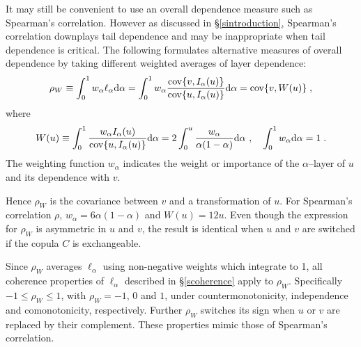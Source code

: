 \documentclass[authoryear]{elsarticle}
\newcommand{\cov}{{\rm cov}}
\newcommand{\de}{\mathrm{d}}
\newcommand{\cq}{\ ,\quad }
\newcommand{\sref}[1]{\S\ref{#1}}
\begin{document}
It may still be convenient to use an overall dependence measure such as Spearman's correlation. However as discussed in \sref{sintroduction}, Spearman's correlation downplays tail dependence and may be inappropriate when tail dependence is critical. The following formulates alternative measures of overall dependence by taking different weighted averages of layer dependence:
$$
\rho_W\equiv  \int_0^1 w_\alpha \ell_\alpha \de \alpha
= \int_0^1 w_\alpha \frac{ \cov\{v,I_\alpha(u)\}}{\cov\{u,I_\alpha(u)\}} \de \alpha=\cov\{v,W(u)\} \;,
$$
where
$$
W(u)\equiv \int_0^1 \frac{w_\alpha I_\alpha(u)}{\cov\{u,I_\alpha(u)\}}\de\alpha
= 2\int_0^u \frac{w_\alpha }{\alpha(1-\alpha)}\de\alpha
\cq \int_0^1 w_\alpha \de\alpha=1 \;.
$$
The weighting function $w_\alpha$ indicates the weight or importance of the $\alpha$--layer of $u$ and its dependence with $v$.

Hence  $\rho_W$ is the  covariance between $v$ and a transformation of $u$. For Spearman's correlation $\rho$, $w_\alpha=6\alpha(1-\alpha)$ and $W(u)=12u$. Even though the expression for $\rho_W$ is asymmetric in $u$ and $v$, the result is identical when $u$ and $v$ are switched if the copula $C$ is exchangeable.

Since $\rho_W$ averages $\ell_\alpha$ using non-negative weights which integrate to 1, all coherence properties of $\ell_\alpha$ described in \sref{scoherence} apply to $\rho_W$. Specifically $-1\le\rho_W\le 1$, with $\rho_W=-1$, $0$ and $1$, under countermonotonicity, independence and comonotonicity, respectively.   Further $\rho_W$ switches its sign when $u$ or $v$ are replaced by their complement.  These properties mimic those of Spearman's correlation.
\end{document}
